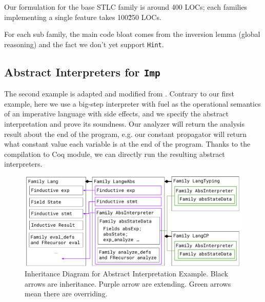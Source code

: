 Our formulation for the base STLC family is around 400 LOCs; each families implementing a single feature takes 100\~250 LOCs. 

For each sub family, the main code bloat comes from the inversion lemma (global reasoning) and the fact we don't yet support  \texttt{Hint}.


\subsection{Abstract Interpreters for \texttt{Imp}}
\label{sec:coqexample-analysis}
The second example is adapted and modified from \citet{zm2017}.
Contrary to our first example, here we use a big-step interpreter with fuel
as the operational semantics of an imperative language with
side effects, and we specify the abstract interpretation and prove its
soundness. 
Our analyzer will return the analysis result about the end of the program, e.g. our constant propagator will return what constant value each variable is at the end of the program. Thanks to the compilation to Coq module, we can directly run the resulting abstract interpreters.



\begin{figure}[!htb]
  \includegraphics[width=\columnwidth]{coqexmaple/Family-Lang-Imp3.pdf}
  \caption{Inheritance Diagram for Abstract Interpretation Example. Black arrows are inheritance. Purple arrow are extending. Green arrows mean there are overriding.}\label{fig:abstract-interpretation-example}
\end{figure}

